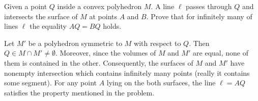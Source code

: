 \problem
Given a point $Q$ inside a convex polyhedron $M$.
A line $\ell$ passes through $Q$ and intersects the surface of $M$ at points
$A$ and $B$.
Prove that for infinitely many of lines $\ell$ the equality $AQ = BQ$ holds.

\solution
Let $M'$ be a polyhedron symmetric to $M$ with respect to $Q$.
Then $Q \in M \cap M' \neq \emptyset$.
Moreover, since the volumes of $M$ and $M'$ are equal, none of them is
contained in the other.
Consequently, the surfaces of $M$ and $M'$ have nonempty intersection which
contains infinitely many points (really it contains some segment).
For any point $A$ lying on the both surfaces, the line $\ell = AQ$
satisfies the property mentioned in the problem.
\endproblem
